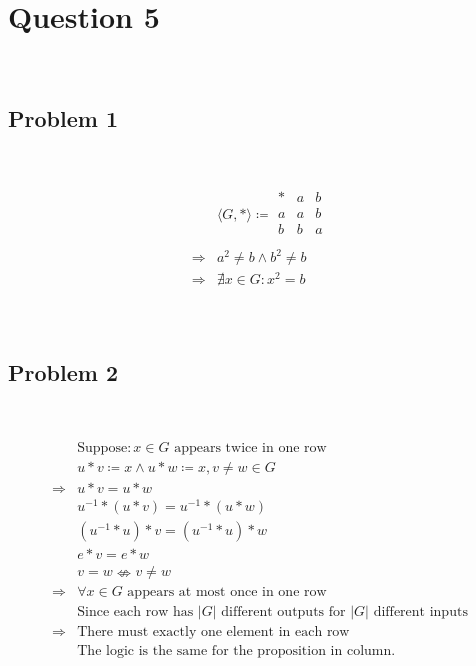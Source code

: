 \documentclass{article}
\begin{document}
\section*{Question 5}

~

\subsection*{Problem 1}

~

\begin{equation*}
    \begin{split}
        &\langle G,*\rangle\coloneqq\begin{array}{c|ccc}
            *&a&b\\
            \hline
            a&a&b\\
            b&b&a\\
        \end{array}\\
        \Rightarrow&a^2\ne b\land b^2\ne b\\
        \Rightarrow&\nexists x\in G:x^2=b\\
    \end{split}
\end{equation*}

~

\subsection*{Problem 2}

~

\begin{equation*}
    \begin{split}
        &\text{Suppose}:x\in G \text{ appears twice in one row}\\
        &u*v\coloneqq x\land u*w\coloneqq x,v\ne w\in G\\
        \Rightarrow&u*v=u*w\\
        &u^{-1}*(u*v)=u^{-1}*(u*w)\\
        &(u^{-1}*u)*v=(u^{-1}*u)*w\\
        &e*v=e*w\\
        &v=w\nLeftrightarrow v\ne w\\
        \Rightarrow&\forall x\in G\text{ appears at most once in one row}\\
        &\text{Since each row has }|G| \text{ different outputs for }|G|\text{ different inputs}\\
        \Rightarrow&\text{There must exactly one element in each row }\\
        &\text{The logic is the same for the proposition in column.}
    \end{split}
\end{equation*}
\end{document}
